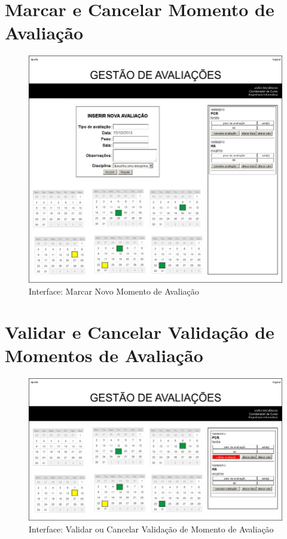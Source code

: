 \section{Marcar e Cancelar Momento de Avaliação}

\begin{figure}[!htbp]
\centering
\includegraphics{imagens/nova_avaliacao_i.jpg}
\caption{Interface: Marcar Novo Momento de Avaliação}
\label{fig:nova_avaliacao_i}
\end{figure}


\clearpage
\section{Validar e Cancelar Validação de Momentos de Avaliação}

\begin{figure}[!htbp]
\centering
\includegraphics{imagens/validar_avaliacao_i.jpg}
\caption{Interface: Validar ou Cancelar Validação de Momento de Avaliação}
\label{fig:validar_avaliacao_i}
\end{figure}
